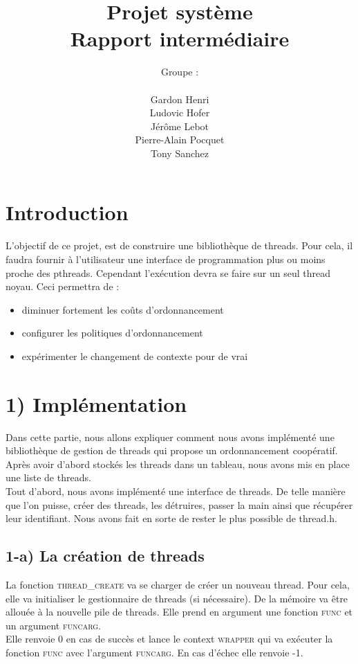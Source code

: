 \documentclass{report}
\author{Groupe :\\ \\Gardon Henri\\Ludovic Hofer\\Jérôme Lebot\\Pierre-Alain Pocquet\\Tony Sanchez}
\title{Projet système \\ Rapport intermédiaire}
\begin{document}
\maketitle

\section*{Introduction}
 
 L'objectif de ce projet, est de construire une bibliothèque de threads. Pour cela, il faudra fournir à l'utilisateur une interface de programmation plus ou moins proche des pthreads.
 Cependant l'exécution devra se faire sur un seul thread noyau.
 Ceci permettra de :
 \\
 \begin{itemize}
 \item diminuer fortement les coûts d'ordonnancement
 \item configurer les politiques d'ordonnancement
 \item expérimenter le changement de contexte pour de vrai
 \end{itemize}

\section*{1) Implémentation}
 
 	Dans cette partie, nous allons expliquer comment nous avons implémenté une bibliothèque de gestion de threads qui propose un ordonnancement coopératif. Après avoir d'abord stockés les threads dans un tableau, nous avons mis en place une liste de threads.%
 \\
	Tout d'abord, nous avons implémenté une interface de threads. De telle manière que l'on puisse, créer des threads, les détruires, passer la main ainsi que récupérer leur identifiant. Nous avons fait en sorte de rester le plus possible de thread.h. 

\subsection*{1-a) La création de threads}
La fonction \textsc{thread\_create} va se charger de créer un nouveau thread. Pour cela, elle va initialiser le gestionnaire de threads (si nécessaire). De la mémoire va être allouée à la nouvelle pile de threads. Elle prend en argument une fonction \textsc{func} et un argument \textsc{funcarg}.
\\
Elle renvoie 0 en cas de succès et lance le context \textsc{wrapper} qui va exécuter la fonction \textsc{func} avec l'argument \textsc{funcarg}.
En cas d'échec elle renvoie -1.
\end{document}
